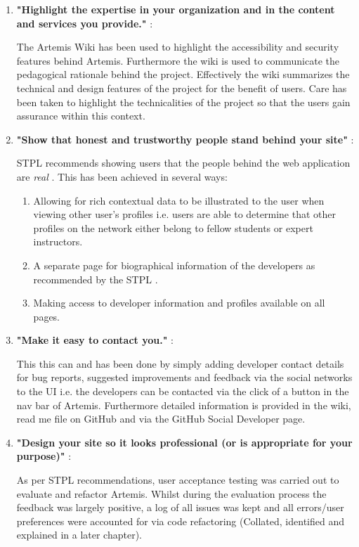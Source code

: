 \begin{enumerate}
    \item \textbf{"Highlight the expertise in your organization and in the content and services you provide."} \cite{Fogg2002a}:
    
   The Artemis Wiki has been used to highlight the accessibility and security features behind Artemis. Furthermore the wiki is used to communicate the pedagogical rationale behind the project. Effectively the wiki summarizes the technical and design features of the project for the benefit of users. Care has been taken to highlight the technicalities of the project so that the users gain assurance within this context.
    
    \item \textbf{"Show that honest and trustworthy people stand behind your site"} \cite{Fogg2002a}:
    
    STPL recommends showing users that the people behind the web application are \textit{real} \cite{Fogg2002a}. This has been achieved in several ways:
    \begin{enumerate}
        \item Allowing for rich contextual data to be illustrated to the user when viewing other user's profiles i.e. users are able to determine that other profiles on the network either belong to fellow students or expert instructors.
        \item A separate page for biographical information of the developers as recommended by the STPL \cite{Fogg2002a}.
        \item Making access to developer information and profiles available on all pages.
    \end{enumerate}
    
    \item \textbf{"Make it easy to contact you."} \cite{Fogg2002a}:
    
    This this can and has been done by simply adding developer contact details for bug reports, suggested improvements and feedback via the social networks to the UI i.e. the developers can be contacted via the click of a button in the nav bar of Artemis. Furthermore detailed information is provided in the wiki, read me file on GitHub and via the GitHub Social Developer page.

    \newpage
    \item \textbf{"Design your site so it looks professional (or is appropriate for your purpose)"} \cite{Fogg2002a}:
    
    As per STPL recommendations, user acceptance testing was carried out to evaluate and refactor Artemis. Whilst during the evaluation process the feedback was largely positive, a log of all issues was kept and all errors/user preferences were accounted for via code refactoring (Collated, identified and explained in a later chapter).


\end{enumerate}
